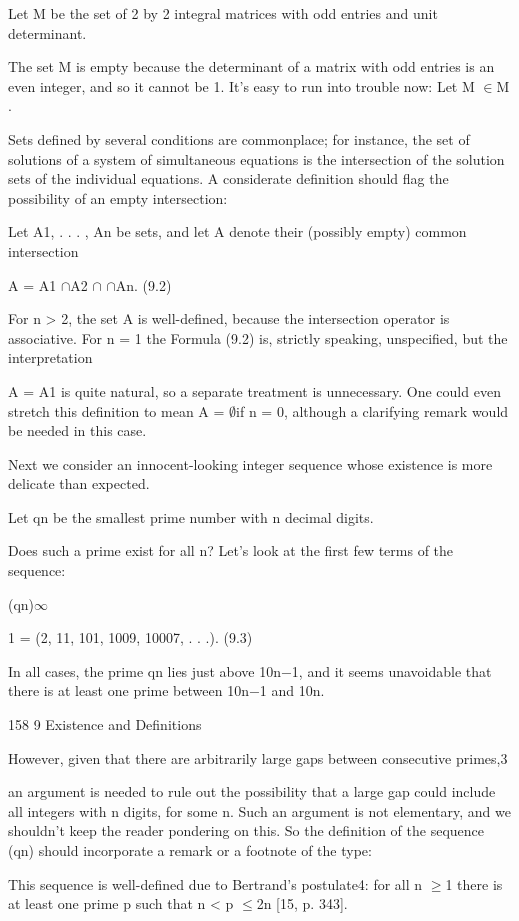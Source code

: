 \documentclass[11pt]{article}
\theoremstyle{plain}
\theoremstyle{definition}
\begin{document}
Let M be the set of 2 by 2 integral matrices with odd entries and unit determinant.

The set M is empty because the determinant of a matrix with odd entries is an even integer, and so it cannot be 1. It's easy to run into trouble now: Let M $\in$M .

Sets defined by several conditions are commonplace; for instance, the set of solutions of a system of simultaneous equations is the intersection of the solution sets of the individual equations. A considerate definition should flag the possibility of an empty intersection:

Let A1, . . . , An be sets, and let A denote their (possibly empty) common intersection

A = A1 $\cap$A2 $\cap$\textperiodcentered{} \textperiodcentered{} \textperiodcentered{} $\cap$An. (9.2)

For n > 2, the set A is well-defined, because the intersection operator is associative. For n = 1 the Formula (9.2) is, strictly speaking, unspecified, but the interpretation

A = A1 is quite natural, so a separate treatment is unnecessary. One could even stretch this definition to mean A = $\emptyset$if n = 0, although a clarifying remark would be needed in this case.

Next we consider an innocent-looking integer sequence whose existence is more delicate than expected.

Let qn be the smallest prime number with n decimal digits.

Does such a prime exist for all n? Let's look at the first few terms of the sequence:

(qn)$\infty$

1 = (2, 11, 101, 1009, 10007, . . .). (9.3)

In all cases, the prime qn lies just above 10n$-$1, and it seems unavoidable that there is at least one prime between 10n$-$1 and 10n.

158 9 Existence and Definitions

However, given that there are arbitrarily large gaps between consecutive primes,3

an argument is needed to rule out the possibility that a large gap could include all integers with n digits, for some n. Such an argument is not elementary, and we shouldn't keep the reader pondering on this. So the definition of the sequence (qn) should incorporate a remark or a footnote of the type:

This sequence is well-defined due to Bertrand's postulate4: for all n $\geq$1 there is at least one prime p such that n < p $\leq$2n [15, p. 343].
\end{document}
